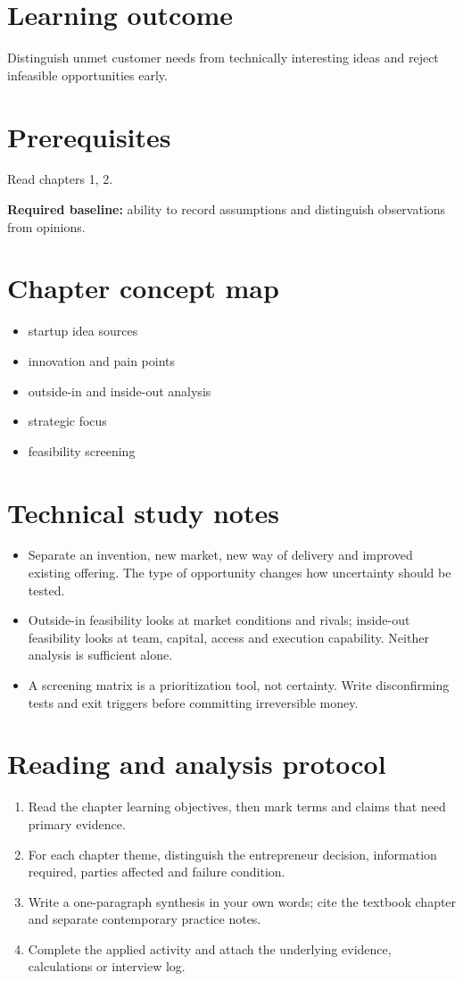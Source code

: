 \documentclass[11pt,letterpaper]{article}
\begin{document}
\SuiteOpen
\section{Learning outcome}
Distinguish unmet customer needs from technically interesting ideas and reject infeasible opportunities early.
\section{Prerequisites}
Read chapters 1, 2.\par\textbf{Required baseline:} ability to record assumptions and distinguish observations from opinions.
\section{Chapter concept map}
\begin{itemize}[leftmargin=*,itemsep=3pt]
\item startup idea sources
\item innovation and pain points
\item outside-in and inside-out analysis
\item strategic focus
\item feasibility screening
\end{itemize}

\section{Technical study notes}
\begin{itemize}[leftmargin=*,itemsep=3pt]
\item Separate an invention, new market, new way of delivery and improved existing offering. The type of opportunity changes how uncertainty should be tested.
\item Outside-in feasibility looks at market conditions and rivals; inside-out feasibility looks at team, capital, access and execution capability. Neither analysis is sufficient alone.
\item A screening matrix is a prioritization tool, not certainty. Write disconfirming tests and exit triggers before committing irreversible money.
\end{itemize}

\section{Reading and analysis protocol}
\begin{enumerate}[leftmargin=*,itemsep=5pt]
\item Read the chapter learning objectives, then mark terms and claims that need primary evidence.
\item For each chapter theme, distinguish the entrepreneur decision, information required, parties affected and failure condition.
\item Write a one-paragraph synthesis in your own words; cite the textbook chapter and separate contemporary practice notes.
\item Complete the applied activity and attach the underlying evidence, calculations or interview log.
\end{enumerate}
\end{document}

